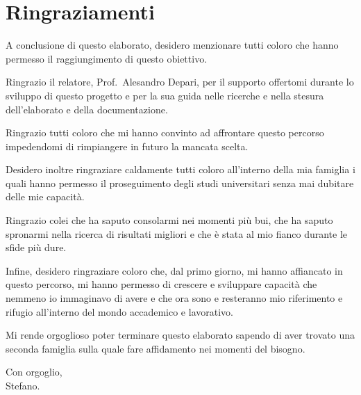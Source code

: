 \chapter*{Ringraziamenti}

A conclusione di questo elaborato, desidero menzionare tutti coloro che hanno permesso il raggiungimento di questo obiettivo.

Ringrazio il relatore, Prof.\ Alesandro Depari, per il supporto offertomi durante lo sviluppo di questo progetto e per la sua guida nelle ricerche e nella stesura dell'elaborato e della documentazione.

Ringrazio tutti coloro che mi hanno convinto ad affrontare questo percorso impedendomi di rimpiangere in futuro la mancata scelta.

Desidero inoltre ringraziare caldamente tutti coloro all'interno della mia famiglia i quali hanno permesso il proseguimento degli studi universitari senza mai dubitare delle mie capacità.

Ringrazio colei che ha saputo consolarmi nei momenti più bui, che ha saputo spronarmi nella ricerca di risultati migliori e che è stata al mio fianco durante le sfide più dure.

Infine, desidero ringraziare coloro che, dal primo giorno, mi hanno affiancato in questo percorso, mi hanno permesso di crescere e sviluppare capacità che nemmeno io immaginavo di avere e che ora sono e resteranno mio riferimento e rifugio all'interno del mondo accademico e lavorativo.

Mi rende orgoglioso poter terminare questo elaborato sapendo di aver trovato una seconda famiglia sulla quale fare affidamento nei momenti del bisogno.

\vfill

{\setlength{\parindent}{0cm}
Con orgoglio,\\
Stefano.
}